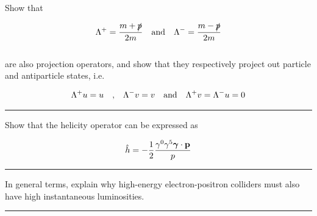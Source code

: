 \begin{problem}{6.3}
    Show that

    \begin{align*}
        \Lambda^+ = \frac{m+\slashed{p}}{2m} \quad \text{and} \quad \Lambda^- = \frac{m-\slashed{p}}{2m}
    \end{align*}\\
    are also projection operators, and show that they respectively project out particle and antiparticle states, i.e.

    \begin{align*}
        \Lambda^+ u = u \quad \text{,} \quad \Lambda^- v = v \quad \text{and} \quad \Lambda^+ v = \Lambda^- u = 0 \\
    \end{align*}
\end{problem}
\begin{solution}

\end{solution}

\noindent\rule{7in}{1.5pt}


\begin{problem}{6.4}
    Show that the helicity operator can be expressed as

    \begin{align*}
        \hat{h} = - \frac{1}{2} \frac{\gamma^0\gamma^5\boldsymbol{\gamma}\cdot\mathbf{p}}{p}\\
    \end{align*}
\end{problem}
\begin{solution}

\end{solution}

\noindent\rule{7in}{1.5pt}


\begin{problem}{6.5}
    In general terms, explain why high-energy electron-positron colliders must also have high instantaneous luminosities.
\end{problem}
\begin{solution}

\end{solution}

\noindent\rule{7in}{1.5pt}

